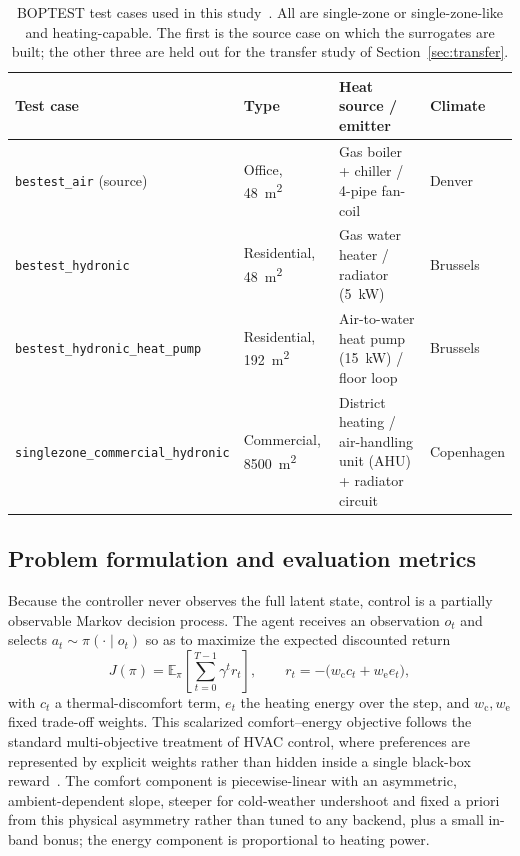 \documentclass{ieeeaccess}
\begin{document}
\begin{table}[!t]
\centering
\caption{BOPTEST test cases used in this study~\cite{Blum2021BOPTEST}. All are single-zone or
single-zone-like and heating-capable. The first is the source case on which the surrogates are
built; the other three are held out for the transfer study of Section~\ref{sec:transfer}.}
\small
\begin{tabular}{@{}llll@{}}
\toprule
Test case & Type & Heat source / emitter & Climate \\
\midrule
\texttt{bestest\_air} (source) & Office, \SI{48}{\meter\squared} & Gas boiler + chiller / 4-pipe fan-coil & Denver \\
\texttt{bestest\_hydronic} & Residential, \SI{48}{\meter\squared} & Gas water heater / radiator (\SI{5}{\kilo\watt}) & Brussels \\
\texttt{bestest\_hydronic\_heat\_pump} & Residential, \SI{192}{\meter\squared} & Air-to-water heat pump (\SI{15}{\kilo\watt}) / floor loop & Brussels \\
\texttt{singlezone\_commercial\_hydronic} & Commercial, \SI{8500}{\meter\squared} & District heating / air-handling unit (AHU) + radiator circuit & Copenhagen \\
\bottomrule
\end{tabular}
\label{tab:testcases}
\end{table}

\subsection{Problem formulation and evaluation metrics}\label{ssec:pomdp}
Because the controller never observes the full latent state, control is a partially observable
Markov decision process. The agent receives an observation $o_t$ and selects
$a_t\sim\pi(\cdot\mid o_t)$ so as to maximize the expected discounted return~\cite{Sutton2018RL}
\begin{equation}
J(\pi)=\mathbb{E}_{\pi}\!\left[\sum_{t=0}^{T-1}\gamma^{t} r_t\right],
\qquad r_t=-\big(w_{\mathrm{c}} c_t + w_{\mathrm{e}} e_t\big),
\label{eq:return}
\end{equation}
with $c_t$ a thermal-discomfort term, $e_t$ the heating energy over the step, and
$w_{\mathrm{c}},w_{\mathrm{e}}$ fixed trade-off weights. This scalarized comfort--energy objective
follows the standard multi-objective treatment of HVAC control, where preferences are represented by
explicit weights rather than hidden inside a single black-box
reward~\cite{Roijers2013MOSurvey,Yang2019MORL,Hayes2022MOSurvey}. The comfort component is
piecewise-linear with an asymmetric, ambient-dependent slope, steeper for cold-weather undershoot
and fixed a priori from this physical asymmetry rather than tuned to any backend, plus a small
in-band bonus; the energy component is proportional to heating power.
\end{document}
